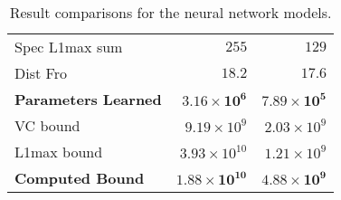 \documentclass[11pt, reqno]{amsart}
\begin{document}
\begin{problem}[1]
\begin{table}[h]
\begin{minipage}{.6\textwidth}
\begin{tabular}{| l | r | r |}
          Spec L1max sum 	          & $255$                               & $129$                               \\
          Dist Fro 	                & $18.2$                              & $17.6$                              \\
          \textbf{Parameters Learned} & $\mathbf{3.16 \times 10^{6}}$     & $\mathbf{7.89 \times 10^{5}}$                \\
          VC bound 	                & $9.19 \times 10^{9}$                & $2.03 \times 10^{9}$                \\
          L1max bound 	            & $3.93 \times 10^{10}$               & $1.21 \times 10^{9}$                \\
          \midrule
          \textbf{Computed Bound}   & $\mathbf{1.88 \times 10^{10}}$      & $\mathbf{4.88 \times 10^{9}}$       \\
          \toprule
        \end{tabular}
        \caption{Result comparisons for the neural network models.}~\label{tab:params}
      \end{minipage}%
    \end{table}


\end{problem}
\end{document}
